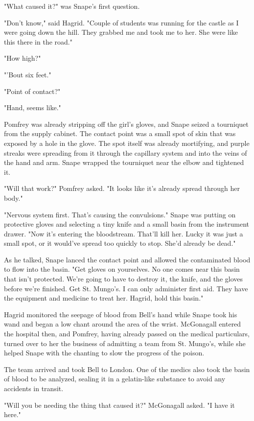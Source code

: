 \documentclass[a4paper,11pt]{article}
\begin{document}
"What caused it?" was Snape's first question.

"Don't know," said Hagrid. "Couple of students was running for the castle as I were going down the hill. They grabbed me and took me to her. She were like this there in the road."

"How high?"

"'Bout six feet."

"Point of contact?"

"Hand, seems like."

Pomfrey was already stripping off the girl's gloves, and Snape seized a tourniquet from the supply cabinet. The contact point was a small spot of skin that was exposed by a hole in the glove. The spot itself was already mortifying, and purple streaks were spreading from it through the capillary system and into the veins of the hand and arm. Snape wrapped the tourniquet near the elbow and tightened it.

"Will that work?" Pomfrey asked. "It looks like it's already spread through her body."

"Nervous system first. That's causing the convulsions." Snape was putting on protective gloves and selecting a tiny knife and a small basin from the instrument drawer. "Now it's entering the bloodstream. That'll kill her. Lucky it was just a small spot, or it would've spread too quickly to stop. She'd already be dead."

As he talked, Snape lanced the contact point and allowed the contaminated blood to flow into the basin. "Get gloves on yourselves. No one comes near this basin that isn't protected. We're going to have to destroy it, the knife, and the gloves before we're finished. Get St. Mungo's. I can only administer first aid. They have the equipment and medicine to treat her. Hagrid, hold this basin."

Hagrid monitored the seepage of blood from Bell's hand while Snape took his wand and began a low chant around the area of the wrist. McGonagall entered the hospital then, and Pomfrey, having already passed on the medical particulars, turned over to her the business of admitting a team from St. Mungo's, while she helped Snape with the chanting to slow the progress of the poison.

The team arrived and took Bell to London. One of the medics also took the basin of blood to be analyzed, sealing it in a gelatin-like substance to avoid any accidents in transit.

"Will you be needing the thing that caused it?" McGonagall asked. "I have it here."
\end{document}
